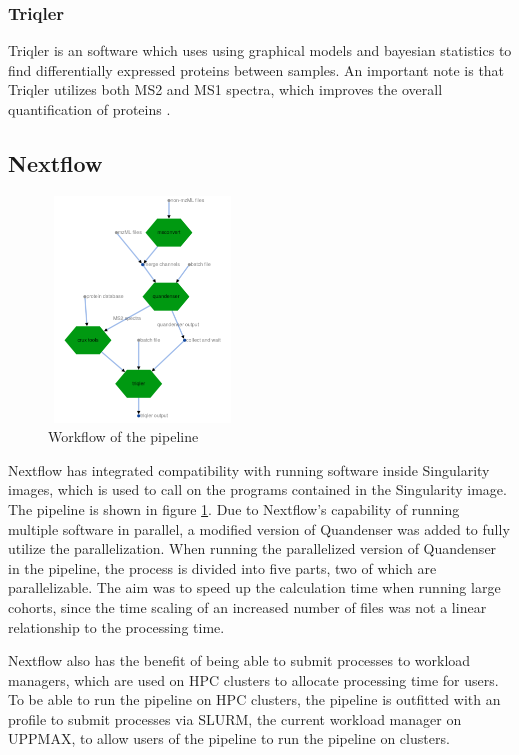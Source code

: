 \subsubsection{Triqler}
Triqler is an software which uses using graphical models and bayesian statistics to find differentially expressed proteins between samples. An important note is that Triqler utilizes both MS2 and MS1 spectra, which improves the overall quantification of proteins \cite{triqler}.

\subsection{Nextflow}

\begin{figure}
  \centering
  \includegraphics[width=5cm, height=6cm]{pictures/workflow.png}
  \caption{Workflow of the pipeline}
  \label{fig:workflow}
\end{figure}

Nextflow has integrated compatibility with running software inside Singularity images, which is used to call on the programs contained in the Singularity image. The pipeline is shown in figure \ref{fig:workflow}. Due to Nextflow's capability of running multiple software in parallel, a modified version of Quandenser was added to fully utilize the parallelization. When running the parallelized version of Quandenser in the pipeline, the process is divided into five parts, two of which are parallelizable. The aim was to speed up the calculation time when running large cohorts, since the time scaling of an increased number of files was not a linear relationship to the processing time.

Nextflow also has the benefit of being able to submit processes to workload managers, which are used on HPC clusters to allocate processing time for users. To be able to run the pipeline on HPC clusters, the pipeline is outfitted with an profile to submit processes via SLURM, the current workload manager on UPPMAX, to allow users of the pipeline to run the pipeline on clusters.

